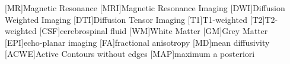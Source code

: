 [MR]{Magnetic Resonance}
[MRI]{Magnetic Resonance Imaging}
[DWI]{Diffusion Weighted Imaging}
[DTI]{Diffusion Tensor Imaging}
[T1]{T1-weighted}
[T2]{T2-weighted}
[CSF]{cerebrospinal fluid}
[WM]{White Matter}
[GM]{Grey Matter}
[EPI]{echo-planar imaging}
[FA]{fractional anisotropy}
[MD]{mean diffusivity}
[ACWE]{Active Contours without edges}
[MAP]{maximum a posteriori}